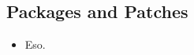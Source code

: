 \documentclass{article}
\begin{document}
\subsection{Packages and Patches}

\begin{itemize}
  \item Eso.
\end{itemize}
\end{document}
